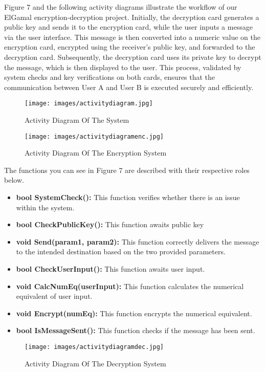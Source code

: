 \documentclass[12pt]{article}
\begin{document}
Figure 7 and the following activity diagrams illustrate the workflow of our ElGamal encryption-decryption project. Initially, the decryption card generates a public key and sends it to the encryption card, while the user inputs a message via the user interface. This message is then converted into a numeric value on the encryption card, encrypted using the receiver's public key, and forwarded to the decryption card. Subsequently, the decryption card uses its private key to decrypt the message, which is then displayed to the user. This process, validated by system checks and key verifications on both cards, ensures that the communication between User A and User B is executed securely and efficiently.
 	\begin{figure}[H]
 		\centering
 		\label{Uml Diagram Of The System}
 		\texttt{[image: images/activitydiagram.jpg]}\\[0.5 cm]	
 		\caption{Activity Diagram Of The System} 		
 	\end{figure}
 \newpage
 	\begin{figure}[H]
 	\centering
 	\label{Enc Diagram}
 	\texttt{[image: images/activitydiagramenc.jpg]}\\[0.5 cm]	
 	\caption{Activity Diagram Of The Encryption System } 		
 \end{figure}
The functions you can see in Figure 7 are described with their respective roles below.
\begin{itemize}
	\item \textbf{bool SystemCheck():} This function verifies whether there is an issue within the system.
	\item \textbf{bool CheckPublicKey():} This function awaits public key
	\item \textbf{void Send(param1, param2):} 
	This function correctly delivers the message to the intended destination based on the two provided parameters.
	\item \textbf{bool CheckUserInput():}  This function awaits user input.
	\item \textbf{void CalcNumEq(userInput):} This function calculates the numerical equivalent of user input.
	\item \textbf{void Encrypt(numEq):} This function encrypts the numerical equivalent.
	\item \textbf {bool IsMessageSent():} This function checks if the message has been sent.
\end{itemize}
 \newpage
\begin{figure}[H]
	\centering
	\label{dec Diagram}
	\texttt{[image: images/activitydiagramdec.jpg]}\\[0.5 cm]	
	\caption{Activity Diagram Of The Decryption System } 		
\end{figure}
\end{document}
